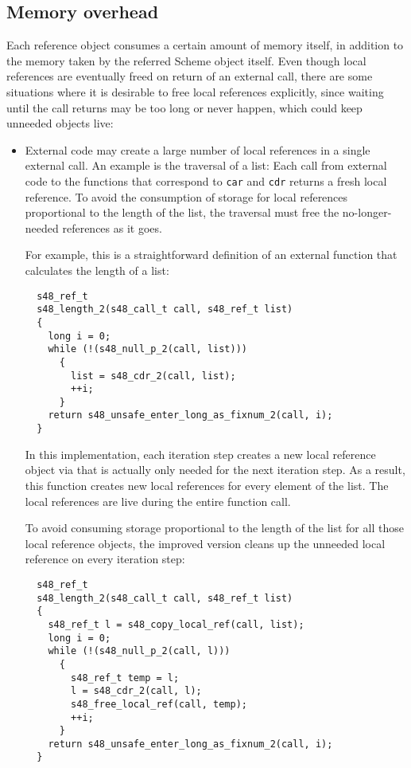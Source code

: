 \subsection{Memory overhead}
\label{sec:memory-overhead}

Each reference object consumes a certain amount of memory itself, in
addition to the memory taken by the referred Scheme object itself.
Even though local references are eventually freed on return of an
external call, there are some situations where it is desirable to free
local references explicitly, since waiting until the call returns may
be too long or never happen, which could keep unneeded objects live:

\begin{itemize}
\item External code may create a large number of local references in a
  single external call.  An example is the traversal of a list: Each
  call from external code to the functions that correspond to
  \texttt{car} and \texttt{cdr} returns a fresh local reference.  To
  avoid the consumption of storage for local references proportional
  to the length of the list, the traversal must free the
  no-longer-needed references as it goes.

For example, this is a straightforward definition of an
  external function that calculates the length of a list:

\begin{verbatim}
  s48_ref_t
  s48_length_2(s48_call_t call, s48_ref_t list)
  {
    long i = 0;
    while (!(s48_null_p_2(call, list)))
      {
        list = s48_cdr_2(call, list);
        ++i;
      }
    return s48_unsafe_enter_long_as_fixnum_2(call, i);
  }
\end{verbatim}

  \noindent{}In this implementation, each iteration step creates a new
  local reference object via  that is actually only
  needed for the next iteration step.  As a result, this function
  creates new local references for every element of the list.  The
  local references are live during the entire function call.

  To avoid consuming storage proportional to the length of the list
  for all those local reference objects, the improved version cleans
  up the unneeded local reference on every iteration step:

\begin{verbatim}
  s48_ref_t
  s48_length_2(s48_call_t call, s48_ref_t list)
  {
    s48_ref_t l = s48_copy_local_ref(call, list);
    long i = 0;
    while (!(s48_null_p_2(call, l)))
      {
        s48_ref_t temp = l;
        l = s48_cdr_2(call, l);
        s48_free_local_ref(call, temp);
        ++i;
      }
    return s48_unsafe_enter_long_as_fixnum_2(call, i);
  }
\end{verbatim}


\end{itemize}
